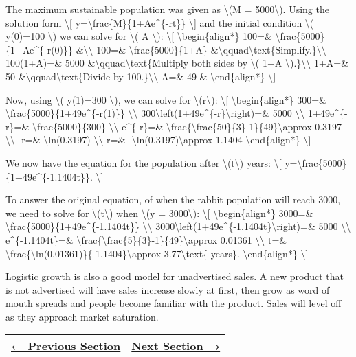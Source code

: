 The maximum sustainable population was given as \textbackslash{}(M =
5000\textbackslash{}). Using the solution form \textbackslash{}{[}
y=\textbackslash{}frac\{M\}\{1+Ae\^{}\{-rt\}\} \textbackslash{}{]} and
the initial condition \textbackslash{}( y(0)=100 \textbackslash{}) we
can solve for \textbackslash{}( A \textbackslash{}): \textbackslash{}{[}
\textbackslash{}begin\{align*\} 100=\&
\textbackslash{}frac\{5000\}\{1+Ae\^{}\{-r(0)\}\}
\&\textbackslash{}\textbackslash{} 100=\&
\textbackslash{}frac\{5000\}\{1+A\}
\&\textbackslash{}qquad\textbackslash{}text\{Simplify.\}\textbackslash{}\textbackslash{}
100(1+A)=\& 5000 \&\textbackslash{}qquad\textbackslash{}text\{Multiply
both sides by \textbackslash{}( 1+A
\textbackslash{}).\}\textbackslash{}\textbackslash{} 1+A=\& 50
\&\textbackslash{}qquad\textbackslash{}text\{Divide by
100.\}\textbackslash{}\textbackslash{} A=\& 49 \&
\textbackslash{}end\{align*\} \textbackslash{}{]}

Now, using \textbackslash{}( y(1)=300 \textbackslash{}), we can solve
for \textbackslash{}(r\textbackslash{}): \textbackslash{}{[}
\textbackslash{}begin\{align*\} 300=\&
\textbackslash{}frac\{5000\}\{1+49e\^{}\{-r(1)\}\}
\textbackslash{}\textbackslash{}
300\textbackslash{}left(1+49e\^{}\{-r\}\textbackslash{}right)=\& 5000
\textbackslash{}\textbackslash{} 1+49e\^{}\{-r\}=\&
\textbackslash{}frac\{5000\}\{300\} \textbackslash{}\textbackslash{}
e\^{}\{-r\}=\&
\textbackslash{}frac\{\textbackslash{}frac\{50\}\{3\}-1\}\{49\}\textbackslash{}approx
0.3197 \textbackslash{}\textbackslash{} -r=\& \textbackslash{}ln(0.3197)
\textbackslash{}\textbackslash{} r=\&
-\textbackslash{}ln(0.3197)\textbackslash{}approx 1.1404
\textbackslash{}end\{align*\} \textbackslash{}{]}

We now have the equation for the population after
\textbackslash{}(t\textbackslash{}) years: \textbackslash{}{[}
y=\textbackslash{}frac\{5000\}\{1+49e\^{}\{-1.1404t\}\}.
\textbackslash{}{]}

To answer the original equation, of when the rabbit population will
reach 3000, we need to solve for \textbackslash{}(t\textbackslash{})
when \textbackslash{}(y = 3000\textbackslash{}): \textbackslash{}{[}
\textbackslash{}begin\{align*\} 3000=\&
\textbackslash{}frac\{5000\}\{1+49e\^{}\{-1.1404t\}\}
\textbackslash{}\textbackslash{}
3000\textbackslash{}left(1+49e\^{}\{-1.1404t\}\textbackslash{}right)=\&
5000 \textbackslash{}\textbackslash{} e\^{}\{-1.1404t\}=\&
\textbackslash{}frac\{\textbackslash{}frac\{5\}\{3\}-1\}\{49\}\textbackslash{}approx
0.01361 \textbackslash{}\textbackslash{} t=\&
\textbackslash{}frac\{\textbackslash{}ln(0.01361)\}\{-1.1404\}\textbackslash{}approx
3.77\textbackslash{}text\{ years\}. \textbackslash{}end\{align*\}
\textbackslash{}{]}

Logistic growth is also a good model for unadvertised sales. A new
product that is not advertised will have sales increase slowly at first,
then grow as word of mouth spreads and people become familiar with the
product. Sales will level off as they approach market saturation.

\begin{longtable}[]{@{}ll@{}}
\toprule
\endhead
\href{section3-7.php}{← Previous Section} &
\href{../chapter4/section4-1.php}{Next Section →}\tabularnewline
\bottomrule
\end{longtable}
